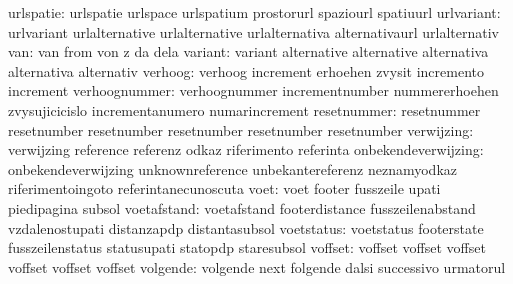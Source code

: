                 urlspatie: urlspatie                 urlspace
                           urlspatium                prostorurl
                           spaziourl                 spatiuurl
               urlvariant: urlvariant                urlalternative
                           urlalternative            urlalternativa
                           alternativaurl            urlalternativ
                      van: van                       from
                           von                       z
                           da                        dela
                  variant: variant                   alternative
                           alternative               alternativa
                           alternativa               alternativ
                  verhoog: verhoog                   increment
                           erhoehen                  zvysit
                           incremento                increment %
            verhoognummer: verhoognummer             incrementnumber
                           nummererhoehen            zvysujicicislo
                           incrementanumero          numarincrement
resetnummer: resetnummer             resetnumber
             resetnumber             resetnumber
             resetnumber             resetnumber
               verwijzing: verwijzing                reference
                           referenz                  odkaz
                           riferimento               referinta
      onbekendeverwijzing: onbekendeverwijzing       unknownreference
                           unbekantereferenz         neznamyodkaz
                           riferimentoingoto         referintanecunoscuta
                     voet: voet                      footer
                           fusszeile                 upati
                           piedipagina               subsol
              voetafstand: voetafstand               footerdistance
                           fusszeilenabstand         vzdalenostupati
                           distanzapdp               distantasubsol
               voetstatus: voetstatus                footerstate
                           fusszeilenstatus          statusupati
                           statopdp                  staresubsol
                  voffset: voffset                   voffset
                           voffset                   voffset
                           voffset                   voffset
                 volgende: volgende                  next
                           folgende                  dalsi
                           successivo                urmatorul
